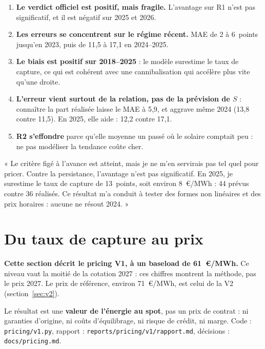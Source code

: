 \documentclass[11pt,a4paper]{article}
\newcommand{\code}[1]{\texttt{\small #1}}
\begin{document}
\begin{enumerate}
\item \textbf{Le verdict officiel est positif, mais fragile.} L'avantage sur R1 n'est pas significatif, et il est négatif sur 2025 et 2026.
\item \textbf{Les erreurs se concentrent sur le régime récent.} MAE de 2 à 6~points jusqu'en 2023, puis de 11,5 à 17,1 en 2024--2025.
\item \textbf{Le biais est positif sur 2018--2025} : le modèle surestime le taux de capture, ce qui est cohérent avec une cannibalisation qui accélère plus vite qu'une droite.
\item \textbf{L'erreur vient surtout de la relation, pas de la prévision de $S$} : connaître la part réalisée laisse le MAE à 5,9, et aggrave même 2024 (13,8 contre 11,5). En 2025, elle aide : 12,2 contre 17,1.
\item \textbf{R2 s'effondre} parce qu'elle moyenne un passé où le solaire comptait peu : ne pas modéliser la tendance coûte cher.
\end{enumerate}

\begin{entretien}
« Le critère figé à l'avance est atteint, mais je ne m'en servirais pas tel quel pour pricer. Contre la persistance, l'avantage n'est pas significatif. En 2025, je surestime le taux de capture de
13~points, soit environ 8~€/MWh : 44 prévus contre 36 réalisés. Ce résultat m'a conduit à tester des formes non linéaires et des prix horaires : aucune ne résout 2024. »
\end{entretien}

\section{Du taux de capture au prix}
\label{sec:pricing}

\begin{attention}
\textbf{Cette section décrit le pricing V1, à un baseload de 61~€/MWh.} Ce niveau vaut la moitié de la cotation 2027 : ces chiffres montrent la méthode, pas le prix 2027. Le prix de référence, environ 71~€/MWh, est celui de la V2 (section~\ref{sec:v2}).

\medskip
Le résultat est une \textbf{valeur de l'énergie au spot}, pas un prix de contrat : ni garanties d'origine, ni coûts d'équilibrage, ni risque de crédit, ni marge. Code : \code{pricing/v1.py}, rapport : \code{reports/pricing/v1/rapport.md}, décisions : \code{docs/pricing.md}.
\end{attention}
\end{document}
